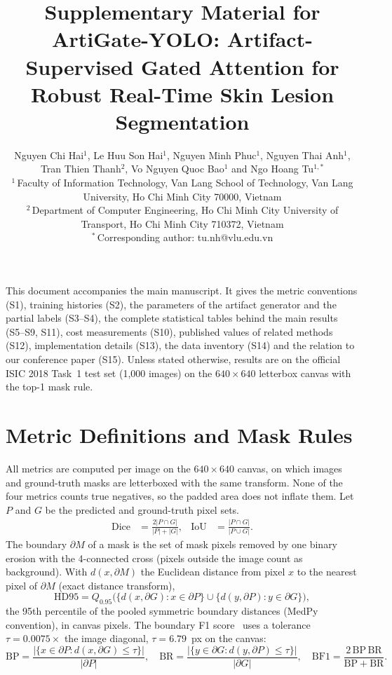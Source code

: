 \documentclass[10pt,a4paper]{article}
\title{Supplementary Material for\\[2pt]
\large ArtiGate-YOLO: Artifact-Supervised Gated Attention for Robust Real-Time Skin Lesion Segmentation}
\author{Nguyen Chi Hai$^{1}$, Le Huu Son Hai$^{1}$, Nguyen Minh Phuc$^{1}$, Nguyen Thai Anh$^{1}$,\\
Tran Thien Thanh$^{2}$, Vo Nguyen Quoc Bao$^{1}$ and Ngo Hoang Tu$^{1,*}$\\[4pt]
\footnotesize $^{1}$\,Faculty of Information Technology, Van Lang School of Technology, Van Lang University, Ho Chi Minh City 70000, Vietnam\\
\footnotesize $^{2}$\,Department of Computer Engineering, Ho Chi Minh City University of Transport, Ho Chi Minh City 710372, Vietnam\\
\footnotesize $^{*}$\,Corresponding author: tu.nh@vlu.edu.vn}
\date{}
\begin{document}
\maketitle

\noindent This document accompanies the main manuscript. It gives the metric conventions (S1), training histories (S2), the parameters of the artifact generator and the partial labels (S3--S4), the complete statistical tables behind the main results (S5--S9, S11), cost measurements (S10), published values of related methods (S12), implementation details (S13), the data inventory (S14) and the relation to our conference paper (S15). Unless stated otherwise, results are on the official ISIC 2018 Task~1 test set (1,000 images) on the $640\times640$ letterbox canvas with the top-1 mask rule.

\tableofcontents
\clearpage

\section{Metric Definitions and Mask Rules}\label{sec:s-metrics}
All metrics are computed per image on the $640\times640$ canvas, on which images and ground-truth masks are letterboxed with the same transform. None of the four metrics counts true negatives, so the padded area does not inflate them. Let $P$ and $G$ be the predicted and ground-truth pixel sets.
\begin{align}
\mathrm{Dice}&=\frac{2|P\cap G|}{|P|+|G|}, &
\mathrm{IoU}&=\frac{|P\cap G|}{|P\cup G|}.
\end{align}
The boundary $\partial M$ of a mask is the set of mask pixels removed by one binary erosion with the 4-connected cross (pixels outside the image count as background). With $d(x,\partial M)$ the Euclidean distance from pixel $x$ to the nearest pixel of $\partial M$ (exact distance transform),
\begin{equation}
\mathrm{HD95}=Q_{0.95}\big(\{d(x,\partial G):x\in\partial P\}\cup\{d(y,\partial P):y\in\partial G\}\big),
\end{equation}
the 95th percentile of the pooled symmetric boundary distances (MedPy convention), in canvas pixels. The boundary F1 score~\cite{csurka2013bf} uses a tolerance $\tau=0.0075\times$ the image diagonal, $\tau=6.79$~px on the canvas:
\begin{equation}
\mathrm{BP}=\frac{|\{x\in\partial P:d(x,\partial G)\le\tau\}|}{|\partial P|},\quad
\mathrm{BR}=\frac{|\{y\in\partial G:d(y,\partial P)\le\tau\}|}{|\partial G|},\quad
\mathrm{BF1}=\frac{2\,\mathrm{BP}\,\mathrm{BR}}{\mathrm{BP}+\mathrm{BR}}.
\end{equation}
\end{document}
